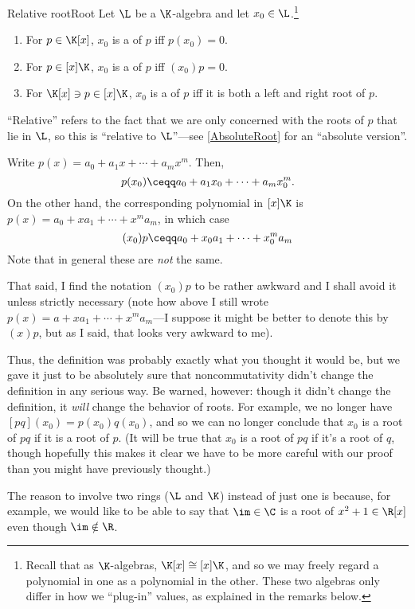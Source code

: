 \begin{dfn}{Relative root}{Root}
	Let $\L$ be a $\K$-algebra and let $x_0\in \L$.\footnote{Recall that as $\K$-algebras, $\K [x]\cong [x]\K$, and so we may freely regard a polynomial in one as a polynomial in the other.  These two algebras only differ in how we ``plug-in'' values, as explained in the remarks below.}
	\begin{enumerate}
		\item For $p\in \K [x]$, $x_0$ is a  of $p$ iff $p(x_0)=0$.
		\item For $p\in [x]\K$, $x_0$ is a  of $p$ iff $(x_0)p=0$.
		\item For $\K [x]\ni p\in [x]\K$, $x_0$ is a  of $p$ iff it is both a left and right root of $p$.
	\end{enumerate}
	\begin{rmk}
		``Relative'' refers to the fact that we are only concerned with the roots of $p$ that lie in $\L$, so this is ``relative to $\L$''---see \cref{AbsoluteRoot} for an ``absolute version''.
	\end{rmk}
	\begin{rmk}
		Write $p(x)=a_0+a_1x+\cdots +a_mx^m$.  Then,
		\begin{equation}
			p(x_0)\ceqq a_0+a_1x_0+\cdots +a_mx_0^m.
		\end{equation}
		On the other hand, the corresponding polynomial in $[x]\K$ is $p(x)=a_0+xa_1+\cdots +x^ma_m$, in which case
		\begin{equation}
			(x_0)p\ceqq a_0+x_0a_1+\cdots +x_0^ma_m
		\end{equation}
		Note that in general these are \emph{not} the same.  
		
		That said, I find the notation $(x_0)p$ to be rather awkward and I shall avoid it unless strictly necessary (note how above I still wrote $p(x)=a+xa_1+\cdots +x^ma_m$---I suppose it might be better to denote this by $(x)p$, but as I said, that looks very awkward to me). 
	\end{rmk}
	\begin{rmk}
		Thus, the definition was probably exactly what you thought it would be, but we gave it just to be absolutely sure that noncommutativity didn't change the definition in any serious way.  Be warned, however:  though it didn't change the definition, it \emph{will} change the behavior of roots.  For example, we no longer have $[pq](x_0)=p(x_0)q(x_0)$, and so we can no longer conclude that $x_0$ is a root of $pq$ if it is a root of $p$.  (It will be true that $x_0$ is a root of $pq$ if it's a root of $q$, though hopefully this makes it clear we have to be more careful with our proof than you might have previously thought.)
	\end{rmk}
	\begin{rmk}
		The reason to involve two rings ($\L$ and $\K$) instead of just one is because, for example, we would like to be able to say that $\im \in \C$ is a root of $x^2+1\in \R [x]$ even though $\im \notin \R$.
	\end{rmk}
\end{dfn}
